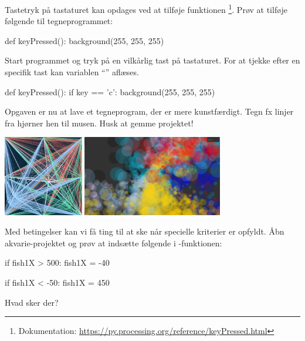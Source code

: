 \documentclass{ucph-handout}
\newcounter{handout}
\newcommand{\Ark}{Ark \#\arabic{handout} -- }
\renewcommand{\Title}{\Ark Tegn med Processing.py}%
\begin{document}
\begin{exercisebox}[adjusted title=Tastatur input]
\vspace{-2mm}
Tastetryk på tastaturet kan opdages ved at tilføje funktionen
\footnote{Dokumentation: \url{https://py.processing.org/reference/keyPressed.html}}. Prøv at tilføje følgende til tegneprogrammet:
\begin{python}
def keyPressed():
    background(255, 255, 255)
\end{python}
Start programmet og tryk på en vilkårlig tast på tastaturet. For at
tjekke efter en specifik tast kan variablen ``'' aflæses.
\begin{python}
def keyPressed():
    if key == 'c':
        background(255, 255, 255)
\end{python}
\vspace{-2mm}
\end{exercisebox}

\begin{exercisebox}[adjusted title=Kreativt tegneprogram]
\vspace{-2mm}
Opgaven er nu at lave et tegneprogram, der er mere kunstfærdigt. Tegn
fx linjer fra hjørner hen til musen. Husk at gemme projektet!
\begin{center}
  \includegraphics[height=3.5cm]{../illustrations/images/tegneprogram2.png}
  \quad
  \includegraphics[height=3.5cm]{../illustrations/images/tegneprogram.png}
\end{center}
\end{exercisebox}
\newpage
{}
\renewcommand{\Title}{\Ark Betingelser}%
\begin{exercisebox}[adjusted title=Eksperimentér]
Med betingelser kan vi få ting til at ske når specielle kriterier er
opfyldt. Åbn akvarie-projektet og prøv at indsætte følgende i
-funktionen:
\begin{python}
if fish1X > 500:
    fish1X = -40
        
if fish1X < -50:
    fish1X = 450
\end{python}

\noindent
Hvad sker der?
\end{exercisebox}
\end{document}
